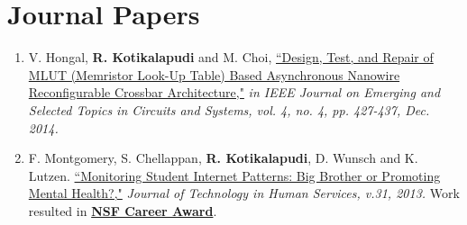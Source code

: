 \documentclass[a4paper,11pt]{article}
\begin{document}
\section{Journal Papers}
\begin{enumerate}[1)]
    \item V. Hongal, \textbf{R. Kotikalapudi} and M. Choi, \href{http://ieeexplore.ieee.org/stamp/stamp.jsp?tp=&arnumber=6924808&isnumber=6970761}{``Design, Test, and Repair of MLUT (Memristor Look-Up Table) Based Asynchronous Nanowire Reconfigurable Crossbar Architecture,"} \emph{in IEEE Journal on Emerging and Selected Topics in Circuits and Systems, vol. 4, no. 4, pp. 427-437, Dec. 2014.}

    \item F. Montgomery, S. Chellappan,\textbf{ R. Kotikalapudi}, D. Wunsch and K. Lutzen. \href{http://www.tandfonline.com/doi/pdf/10.1080/15228835.2012.756600}{``Monitoring Student Internet Patterns: Big Brother or Promoting Mental Health?,"} \emph{Journal of Technology in Human Services, v.31, 2013.} Work resulted in  \textbf{\href{http://www.nsf.gov/awardsearch/showAward?AWD_ID=1254117}{NSF Career Award}}.
\end{enumerate}
\end{document}
